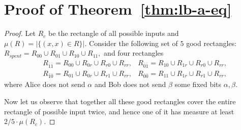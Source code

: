 \section{Proof of Theorem~\ref{thm:lb-a-eq}}
\begin{proof}
Let $R_c$ be the rectangle of all possible inputs and $\mu(R) = \bigl|\{(x,x)\in R\}\bigr|$.
Consider the following set of $5$ good rectangles: 
$R_{spent} = R_{00} \cup R_{01} \cup R_{10} \cup R_{11},$
and four rectangles 
\begin{align*}
&R_{\bar 1\bar 1} = R_{00}\cup R_{0r}\cup R_{r0}\cup R_{rr}, 
&R_{\bar 0\bar 1} = R_{10}\cup R_{1r}\cup R_{r0}\cup R_{rr},\\  
&R_{\bar 1\bar 0} = R_{01}\cup R_{0r}\cup R_{r1}\cup R_{rr},  
&R_{\bar 0\bar 0} = R_{11}\cup R_{1r}\cup R_{r1}\cup R_{rr},
\end{align*}
where Alice does not send $\alpha$ and Bob does not send $\beta$ some fixed bits $\alpha,\beta$.

Now let us observe that together all these good rectangles cover the entire rectangle of possible input twice, and hence one of it has measure at least $2/5\cdot \mu(R_c)$.

\end{proof}

